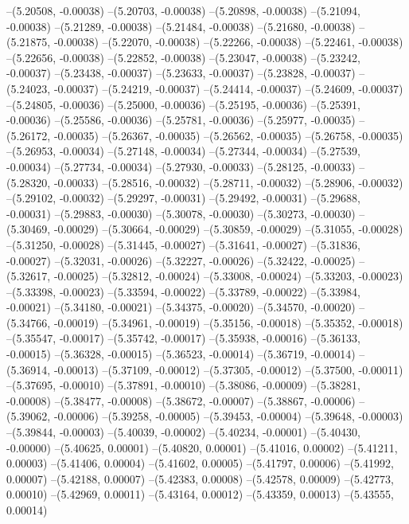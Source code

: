 --(5.20508, -0.00038)
--(5.20703, -0.00038)
--(5.20898, -0.00038)
--(5.21094, -0.00038)
--(5.21289, -0.00038)
--(5.21484, -0.00038)
--(5.21680, -0.00038)
--(5.21875, -0.00038)
--(5.22070, -0.00038)
--(5.22266, -0.00038)
--(5.22461, -0.00038)
--(5.22656, -0.00038)
--(5.22852, -0.00038)
--(5.23047, -0.00038)
--(5.23242, -0.00037)
--(5.23438, -0.00037)
--(5.23633, -0.00037)
--(5.23828, -0.00037)
--(5.24023, -0.00037)
--(5.24219, -0.00037)
--(5.24414, -0.00037)
--(5.24609, -0.00037)
--(5.24805, -0.00036)
--(5.25000, -0.00036)
--(5.25195, -0.00036)
--(5.25391, -0.00036)
--(5.25586, -0.00036)
--(5.25781, -0.00036)
--(5.25977, -0.00035)
--(5.26172, -0.00035)
--(5.26367, -0.00035)
--(5.26562, -0.00035)
--(5.26758, -0.00035)
--(5.26953, -0.00034)
--(5.27148, -0.00034)
--(5.27344, -0.00034)
--(5.27539, -0.00034)
--(5.27734, -0.00034)
--(5.27930, -0.00033)
--(5.28125, -0.00033)
--(5.28320, -0.00033)
--(5.28516, -0.00032)
--(5.28711, -0.00032)
--(5.28906, -0.00032)
--(5.29102, -0.00032)
--(5.29297, -0.00031)
--(5.29492, -0.00031)
--(5.29688, -0.00031)
--(5.29883, -0.00030)
--(5.30078, -0.00030)
--(5.30273, -0.00030)
--(5.30469, -0.00029)
--(5.30664, -0.00029)
--(5.30859, -0.00029)
--(5.31055, -0.00028)
--(5.31250, -0.00028)
--(5.31445, -0.00027)
--(5.31641, -0.00027)
--(5.31836, -0.00027)
--(5.32031, -0.00026)
--(5.32227, -0.00026)
--(5.32422, -0.00025)
--(5.32617, -0.00025)
--(5.32812, -0.00024)
--(5.33008, -0.00024)
--(5.33203, -0.00023)
--(5.33398, -0.00023)
--(5.33594, -0.00022)
--(5.33789, -0.00022)
--(5.33984, -0.00021)
--(5.34180, -0.00021)
--(5.34375, -0.00020)
--(5.34570, -0.00020)
--(5.34766, -0.00019)
--(5.34961, -0.00019)
--(5.35156, -0.00018)
--(5.35352, -0.00018)
--(5.35547, -0.00017)
--(5.35742, -0.00017)
--(5.35938, -0.00016)
--(5.36133, -0.00015)
--(5.36328, -0.00015)
--(5.36523, -0.00014)
--(5.36719, -0.00014)
--(5.36914, -0.00013)
--(5.37109, -0.00012)
--(5.37305, -0.00012)
--(5.37500, -0.00011)
--(5.37695, -0.00010)
--(5.37891, -0.00010)
--(5.38086, -0.00009)
--(5.38281, -0.00008)
--(5.38477, -0.00008)
--(5.38672, -0.00007)
--(5.38867, -0.00006)
--(5.39062, -0.00006)
--(5.39258, -0.00005)
--(5.39453, -0.00004)
--(5.39648, -0.00003)
--(5.39844, -0.00003)
--(5.40039, -0.00002)
--(5.40234, -0.00001)
--(5.40430, -0.00000)
--(5.40625, 0.00001)
--(5.40820, 0.00001)
--(5.41016, 0.00002)
--(5.41211, 0.00003)
--(5.41406, 0.00004)
--(5.41602, 0.00005)
--(5.41797, 0.00006)
--(5.41992, 0.00007)
--(5.42188, 0.00007)
--(5.42383, 0.00008)
--(5.42578, 0.00009)
--(5.42773, 0.00010)
--(5.42969, 0.00011)
--(5.43164, 0.00012)
--(5.43359, 0.00013)
--(5.43555, 0.00014)
